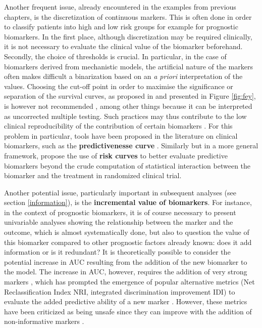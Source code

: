 \documentclass[a4paper,12pt,twoside,onecolumn,openright,final,oldfontcommands]{memoir}
\begin{document}
Another frequent issue, already encountered in the examples from
previous chapters, is the discretization of continuous markers. This is
often done in order to classify patients into high and low risk groups
for example for prognostic biomarkers. In the first place, although
discretization may be required clinically, it is not necessary to
evaluate the clinical value of the biomarker beforehand. Secondly, the
choice of thresholds is crucial. In particular, in the case of
biomarkers derived from mechanistic models, the artificial nature of the
markers often makes difficult a binarization based on an \emph{a priori}
interpretation of the values. Choosing the cut-off point in order to
maximise the significance or separation of the survival curves, as
proposed in \citet{fey2015signaling} and presented in Figure
\ref{fig:fey}, is however not recommended \citep{altman1994dangers},
among other things because it can be interpreted as uncorrected multiple
testing. Such practices may thus contribute to the low clinical
reproducibility of the contribution of certain biomarkers
\citep{hilsenbeck1992so}. For this problem in particular, tools have
been proposed in the literature on clinical biomarkers, such as the
\textbf{predictivenesse curve} \citep{mboup2020evaluating}. Similarly
but in a more general framework, \citet{janes2014approach} propose the
use of \textbf{risk curves} to better evaluate predictive biomarkers
beyond the crude computation of statistical interaction between the
biomarker and the treatment in randomized clinical trial.

Another potential issue, particularly important in subsequent analyses
(see section \ref{information}), is the \textbf{incremental value of
biomarkers}. For instance, in the context of prognostic biomarkers, it
is of course necessary to present univariable analyses showing the
relationship between the marker and the outcome, which is almost
systematically done, but also to question the value of this biomarker
compared to other prognostic factors already known: does it add
information or is it redundant? It is theoretically possible to consider
the potential increase in AUC resulting from the addition of the new
biomarker to the model. The increase in AUC, however, requires the
addition of very strong markers \citep{gail2018breast}, which has
prompted the emergence of popular alternative metrics (Net
Reclassification Index NRI, integrated discrimination improvement IDI)
to evaluate the added predictive ability of a new marker
\citep{pencina2008evaluating}. However, these metrics have been
criticized as being unsafe since they can improve with the addition of
non-informative markers \citep{hilden2014note, pepe2014net}.
\end{document}
